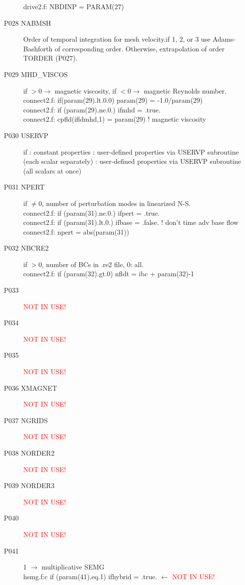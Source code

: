 \begin{description}
drive2.f:      NBDINP = PARAM(27)
\item [P028  NABMSH] Order of temporal integration for mesh velocity.if 1, 2, or 3 use Adams-Bashforth of corresponding order. Otherwise, extrapolation of order TORDER (P027).\\
\item [P029  MHD\_VISCOS] if $>0 \rightarrow$ magnetic viscosity, if $<0 \rightarrow$ magnetic Reynolds number.\\
connect2.f:      if(param(29).lt.0.0) param(29) = -1.0/param(29)\\
connect2.f:      if (param(29).ne.0.) ifmhd  = .true.\\
connect2.f:         cpfld(ifldmhd,1) = param(29)  ! magnetic viscosity
\item [P030  USERVP] if
	: constant properties
	: user-defined properties via USERVP subroutine (each scalar separately)
	: user-defined properties via USERVP subroutine (all scalars at once)
\item [P031  NPERT]  if $\ne 0$, number of perturbation modes in linearized N-S.\\
connect2.f:      if (param(31).ne.0.) ifpert = .true.\\
connect2.f:      if (param(31).lt.0.) ifbase = .false.   ! don't time adv base flow\\
connect2.f:      npert = abs(param(31)) 
\item [P032  NBCRE2] if $>0$, number of BCs in .re2 file, 0: all.\\
connect2.f:      if (param(32).gt.0) nfldt = ibc + param(32)-1
\item [P033  ] {\textcolor{red}{ NOT IN USE!}}
\item [P034  ] {\textcolor{red}{ NOT IN USE!}}
\item [P035  ] {\textcolor{red}{ NOT IN USE!}}
\item [P036  XMAGNET] {\textcolor{red}{ NOT IN USE!}}
\item [P037  NGRIDS] {\textcolor{red}{ NOT IN USE!}}
\item [P038  NORDER2] {\textcolor{red}{ NOT IN USE!}}
\item [P039  NORDER3] {\textcolor{red}{ NOT IN USE!}}
\item [P040  ] {\textcolor{red}{ NOT IN USE!}}
\item [P041  ] 1 $\rightarrow$ multiplicative SEMG\\
hsmg.f:c     if (param(41).eq.1) ifhybrid = .true. $\leftarrow$ {\textcolor{red}{ NOT IN USE!}}

\end{description}
